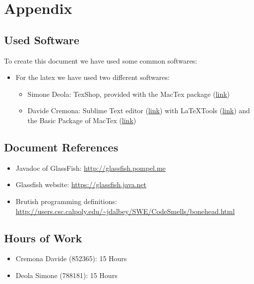 \documentclass[../../dd.tex]{subfiles}
\begin{document}
	\chapter{Appendix}
	
		\section{Used Software}
		To create this document we have used some common softwares:
		\begin{itemize}
			\item For the latex we have used two different softwares:
			\begin{itemize}
			
			\item Simone Deola: TexShop, provided with the MacTex package 					(\href{https://tug.org/mactex/}{link})
			
		\item Davide Cremona: Sublime Text editor (\href{http://www.sublimetext.com}{link}) with LaTeXTools (\href{https://github.com/SublimeText/LaTeXTools}{link}) and the Basic Package of MacTex (\href{https://tug.org/mactex/}{link})

			\end{itemize}
		\end{itemize}

		\section{Document References}
		
		\begin{itemize}
		\item Javadoc of GlassFish: \url{http://glassfish.pompel.me}
		
		\item Glassfish website: \url{https://glassfish.java.net}
		
		\item Brutish programming definitions: \url{http://users.csc.calpoly.edu/~jdalbey/SWE/CodeSmells/bonehead.html }
		
		\end{itemize}
		
		
		\section{Hours of Work}
		\begin{itemize}
		\item Cremona Davide (852365): 15 Hours
		\item Deola Simone (788181): 15 Hours
		\end{itemize}
\end{document}
